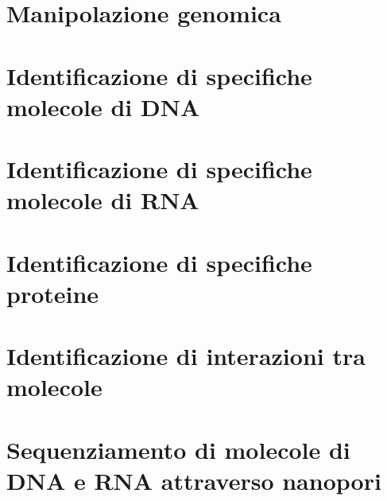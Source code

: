 \section{Manipolazione genomica}


\section{Identificazione di specifiche molecole di DNA}

\section{Identificazione di specifiche molecole di RNA}

\section{Identificazione di specifiche proteine}

\section{Identificazione di interazioni tra molecole}

\section{Sequenziamento di molecole di DNA e RNA attraverso nanopori}
